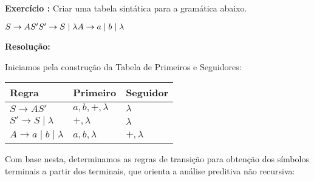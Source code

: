 

\setcounter{count}{0}
\renewcommand{\labelenumi}{\alph{enumi}.}
\newcommand{\exercise}[2]{%
    \stepcounter{count}%
    \noindent\textbf{Exercício \thecount:} #1

    \noindent\textbf{Resolução:}%
    
    #2

    \pagebreak
}



\maketitle
\exercise{
    Criar uma tabela sintática para a gramática abaixo.

    $S \to AS' \\
    S' \to S \mid \lambda \\
    A \to a \mid b \mid \lambda$
}{
    Iniciamos pela construção da Tabela de Primeiros e Seguidores:

    \begin{table}[htbp]
        \centering
        \begin{tabularx}{\linewidth}{ | l | >{\RaggedRight\arraybackslash}X | >{\RaggedRight\arraybackslash}X | }
            \hline
            \textbf{Regra}                        & \textbf{Primeiro}  & \textbf{Seguidor} \\
            \hline
            $S \to AS'$                   & $a, b, +, \lambda$ & $\lambda$         \\
            \hline
            $S' \to S \mid \lambda$       & $+, \lambda$       & $\lambda$         \\
            \hline
            $A \to a \mid b \mid \lambda$ & $a, b, \lambda$    & $+, \lambda$      \\
            \hline
        \end{tabularx}
    \end{table}

    Com base nesta, determinamos as regras de transição para obtenção dos
    símbolos terminais a partir dos terminais, que orienta a análise preditiva
    não recursiva:

}
